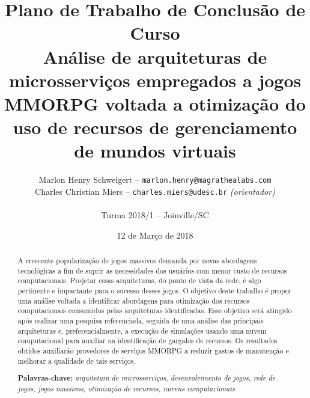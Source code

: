 \documentclass[11pt]{article}
\begin{document}
\pagestyle{fancy}

\title{
Plano de Trabalho de Conclusão de Curso\\
Análise de arquiteturas de microsserviços empregados a jogos MMORPG voltada a otimização do uso de recursos de gerenciamento de mundos virtuais
}

\author{
Marlon Henry Schweigert -- \texttt{marlon.henry@magrathealabs.com}\\
Charles Christian Miers -- \texttt{charles.miers@udesc.br} {\it (orientador)}\\
~\\
Turma 2018/1 -- Joinville/SC
}

\date{12 de Março de 2018}

\maketitle


\onehalfspacing  %


\begin{abstract}
\noindent
  A crescente popularização de jogos massivos demanda por novas abordagens tecnológicas a fim de suprir as necessidades dos usuários com menor custo de recursos computacionais.
  Projetar essas arquiteturas, do ponto de vista da rede, é algo pertinente e impactante para o sucesso desses jogos.
  O objetivo deste trabalho é propor uma análise voltada a identificar abordagens para otimização dos recursos computacionais consumidos pelas arquiteturas identificadas.
  Esse objetivo será atingido após realizar uma pesquisa referenciada, seguida de uma análise das principais arquiteturas e, preferencialmente, a execução de simulações usando uma nuvem computacional para auxiliar na identificação de gargalos de recursos. %
  Os resultados obtidos auxiliarão provedores de serviços \ac{MMORPG} a reduzir gastos de manutenção e melhorar a qualidade de tais serviços.

\textbf{Palavras-chave:} \textit{arquitetura de microsserviços, desenvolvimento de jogos, rede de jogos, jogos massivos, otimização de recursos, nuvens computacionais}
\end{abstract}








\pagebreak





\end{document}
